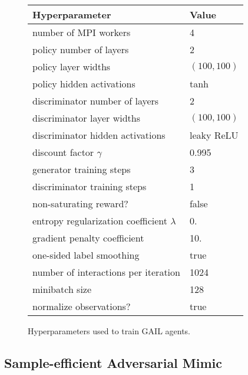 \begin{figure}
  \center
  \begin{tabular}{|ll|}
    \hline
    Hyperparameter&Value\\
    \hline
    number of MPI workers&4\\
    policy number of layers&2\\
    policy layer widths&$(100, 100)$\\
    policy hidden activations&tanh\\
    discriminator number of layers&2\\
    discriminator layer widths&$(100, 100)$\\
    discriminator hidden activations&leaky ReLU\\
    discount factor $\gamma$&0.995\\
    generator training steps&3\\
    discriminator training steps&1\\
    non-saturating reward?&false\\
    entropy regularization coefficient $\lambda$&0.\\
    gradient penalty \cite{Gulrajani2017-mr} coefficient&10.\\
    one-sided label smoothing&true\\
    number of interactions per iteration&1024\\
    minibatch size&128\\
    normalize observations?&true\\
    \hline
  \end{tabular}
  \caption{Hyperparameters used to train GAIL agents.}
\end{figure}

\subsection{Sample-efficient Adversarial Mimic}

